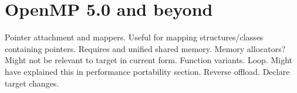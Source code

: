 
\chapter{OpenMP 5.0 and beyond}
Pointer attachment and mappers. Useful for mapping structures/classes containing pointers.
Requires and unified shared memory.
Memory allocators? Might not be relevant to target in current form.
Function variants.
Loop. Might have explained this in performance portability section.
Reverse offload.
Declare target changes.
